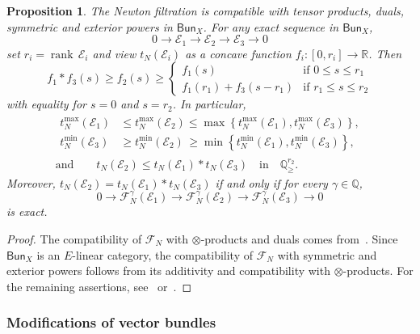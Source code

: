 \documentclass[11pt]{article}
\newtheorem{prop}[theo]{Proposition}
\theoremstyle{definition}
\numberwithin{equation}{section}
\numberwithin{figure}{section}
\numberwithin{table}{section}
\newcommand{\Bun}{\mathsf{Bun}}
\DeclareMathOperator{\rank}{rank}
\begin{document}
\begin{prop}
The Newton filtration is compatible with tensor products, duals, symmetric and exterior powers in $\Bun_{X}$. For any exact sequence in $\Bun_{X}$,
\[
0\rightarrow\mathcal{E}_{1}\rightarrow\mathcal{E}_{2}\rightarrow\mathcal{E}_{3}\rightarrow0
\]
set $r_{i}=\rank\,\mathcal{E}_{i}$ and view $t_{N}(\mathcal{E}_{i})$ as a concave function $f_{i}:[0,r_{i}]\rightarrow\mathbb{R}$. Then
\[
f_{1}\ast f_{3}(s)\geq f_{2}(s)\geq
\begin{cases}
f_{1}(s) & \text{if }0\leq s\leq r_{1}\\
f_{1}(r_{1})+f_{3}(s-r_{1}) & \text{if }r_{1}\leq s\leq r_{2}
\end{cases}
\]
with equality for $s=0$ and $s=r_{2}$. In particular,
\begin{gather*}
\begin{aligned}
t_{N}^{\max}(\mathcal{E}_{1}) & \leq t_{N}^{\max}(\mathcal{E}_{2}) \leq \max\left\{ t_{N}^{\max}(\mathcal{E}_{1}),t_{N}^{\max}(\mathcal{E}_{3})\right\},\\
t_{N}^{\min}(\mathcal{E}_{3}) & \geq t_{N}^{\min}(\mathcal{E}_{2}) \,\geq \min\left\{ t_{N}^{\min}(\mathcal{E}_{1}),t_{N}^{\min}(\mathcal{E}_{3})\right\},
\end{aligned}
\\
\text{and}\qquad t_{N}(\mathcal{E}_{2})\leq t_{N}(\mathcal{E}_{1})\ast t_{N}(\mathcal{E}_{3})\quad\text{in}\quad\mathbb{Q}_{\geq}^{r_{2}}.
\end{gather*}
Moreover, $t_{N}(\mathcal{E}_{2})=t_{N}(\mathcal{E}_{1})\ast t_{N}(\mathcal{E}_{3})$ if and only if for every $\gamma\in\mathbb{Q}$,
\[
0\rightarrow\mathcal{F}_{N}^{\gamma}(\mathcal{E}_{1})\rightarrow\mathcal{F}_{N}^{\gamma}(\mathcal{E}_{2})\rightarrow\mathcal{F}_{N}^{\gamma}(\mathcal{E}_{3})\rightarrow0
\]
is exact.
\end{prop}

\begin{proof}
The compatibility of $\mathcal{F}_{N}$ with $\otimes$-products and duals comes from~\cite[5.6.23]{FaFo15}. Since $\Bun_{X}$ is an $E$-linear category, the compatibility of $\mathcal{F}_{N}$ with symmetric and exterior powers follows from its additivity and compatibility with $\otimes$-products. For the remaining assertions, see~\cite[Proposition~21]{Co16} or~\cite[4.4.4]{An09}.
\end{proof}

\subsubsection{Modifications of vector bundles}
\end{document}
